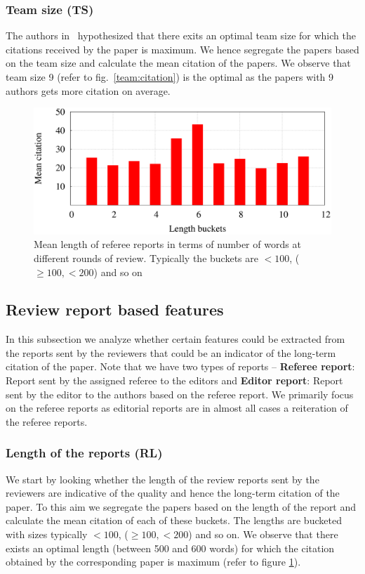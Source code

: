 \subsubsection{Team size (TS)}
The authors in~\cite{chakraborty2014towards} hypothesized that there exits an optimal team size for which the citations received by the paper is maximum. We hence segregate the papers based on the team size and calculate the mean citation of the papers. We observe that team size 9 (refer to fig.~\ref{team:citation}) is the optimal as the papers with 9 authors gets more citation on average.


%

\begin{figure}
\centering
\includegraphics[scale=0.25]{./texfiles/Chapter_4/jcdl/figures/len_citation.eps}
\caption{Mean length of referee reports in terms of number of words at different rounds of review. Typically the buckets are $< 100$, ($\geq 100, < 200$) and so on}
\label{fig:length}
\end{figure}


\subsection{Review report based features}
\label{text_analysis}

In this subsection we analyze whether certain features could be extracted from the reports sent by the reviewers that could be an indicator of the long-term citation of the paper. Note that we have two types of reports -- {\bf Referee report}: Report sent by the assigned referee to the editors and {\bf Editor report}: Report sent by the editor to the authors based on the referee report. We primarily focus on the referee reports as editorial reports are in almost all cases a reiteration of the referee reports.

\subsubsection{Length of the reports (RL)}
We start by looking whether the length of the review reports sent by the reviewers are indicative of the quality and hence the long-term citation of the paper. To this aim we segregate the papers based on the length of the report and calculate the mean citation of each of these buckets. The lengths are bucketed with sizes typically $< 100$, ($\geq 100, < 200$) and so on. We observe that there exists an optimal length (between 500 and 600 words) for which the citation obtained by the corresponding paper is maximum  (refer to figure \ref{fig:length}). 


